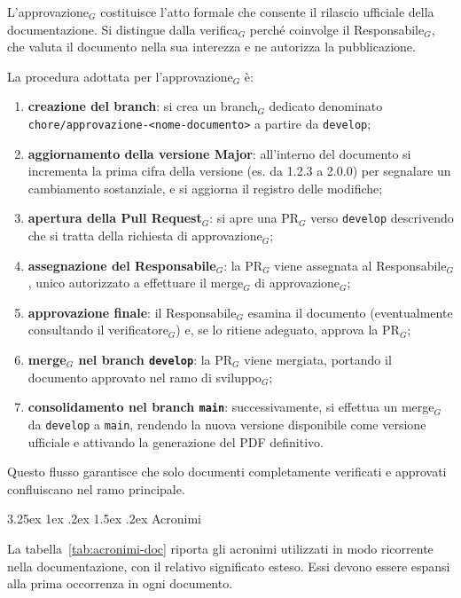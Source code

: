 \documentclass[a4paper, 10pt]{article}
\makeatletter
\renewcommand\paragraph{\@startsection{paragraph}{4}{\z@}%
  {3.25ex \@plus1ex \@minus .2ex}%
  {1.5ex \@plus .2ex}%
  {\normalfont\normalsize\bfseries}}
\makeatother
\begin{document}
L'approvazione$_G$ costituisce l'atto formale che consente il rilascio ufficiale della documentazione. Si distingue dalla verifica$_G$ perché coinvolge il Responsabile$_G$, che valuta il documento nella sua interezza e ne autorizza la pubblicazione.

La procedura adottata per l'approvazione$_G$ è:
\begin{enumerate}
    \item \textbf{creazione del branch}: si crea un branch$_G$ dedicato denominato \texttt{chore/approvazione-<nome-documento>} a partire da \texttt{develop};
    \item \textbf{aggiornamento della versione Major}: all'interno del documento si incrementa la prima cifra della versione (es. da 1.2.3 a 2.0.0) per segnalare un cambiamento sostanziale, e si aggiorna il registro delle modifiche;
    \item \textbf{apertura della Pull Request$_G$}: si apre una PR$_G$ verso \texttt{develop} descrivendo che si tratta della richiesta di approvazione$_G$;
    \item \textbf{assegnazione del Responsabile$_G$}: la PR$_G$ viene assegnata al Responsabile$_G$, unico autorizzato a effettuare il merge$_G$ di approvazione$_G$;
    \item \textbf{approvazione finale}: il Responsabile$_G$ esamina il documento (eventualmente consultando il verificatore$_G$) e, se lo ritiene adeguato, approva la PR$_G$;
    \item \textbf{merge$_G$ nel branch \texttt{develop}}: la PR$_G$ viene mergiata, portando il documento approvato nel ramo di sviluppo$_G$;
    \item \textbf{consolidamento nel branch \texttt{main}}: successivamente, si effettua un merge$_G$ da \texttt{develop} a \texttt{main}, rendendo la nuova versione disponibile come versione ufficiale e attivando la generazione del PDF definitivo.
\end{enumerate}
Questo flusso garantisce che solo documenti completamente verificati e approvati confluiscano nel ramo principale.

\paragraph{Acronimi}

La tabella~\ref{tab:acronimi-doc} riporta gli acronimi utilizzati in modo ricorrente nella documentazione, con il relativo significato esteso. Essi devono essere espansi alla prima occorrenza in ogni documento.
\end{document}
